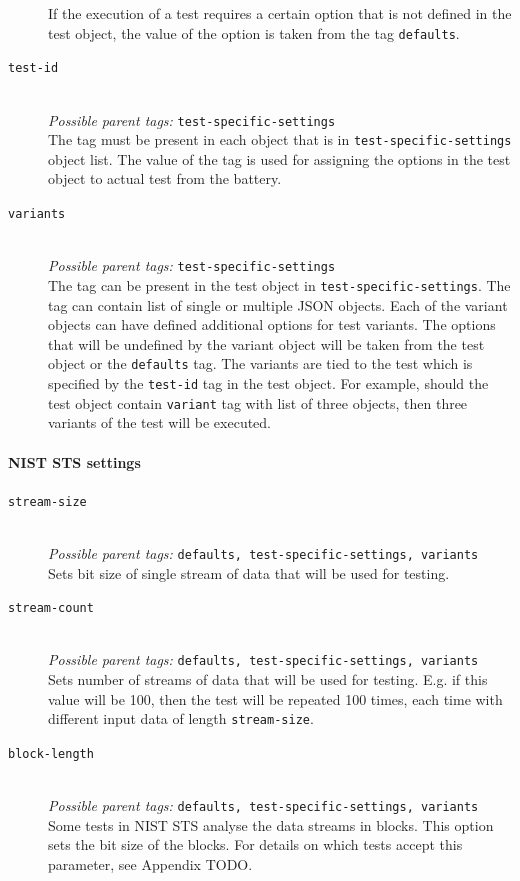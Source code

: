 \documentclass[
  digital,  	%
  color,		%
  oneside,   	%
  12pt,
  nocover,
  notable,
  nolof,
  nolot,
]{fithesis3}
\begin{document}
\begin{description}
If the execution of a test requires a certain option that is not defined in the test object, the value of the option is taken from the tag \texttt{defaults}.

\item[\texttt{test-id}] \hfill \\
\textit{Possible parent tags: } \texttt{test-specific-settings} \\
The tag must be present in each object that is in \texttt{test-specific-settings} object list. The value of the tag is used for assigning the options in the test object to actual test from the battery.

\item[\texttt{variants}] \hfill \\
\textit{Possible parent tags: } \texttt{test-specific-settings} \\
The tag can be present in the test object in \texttt{test-specific-settings}. The tag can contain list of single or multiple JSON objects. Each of the variant objects can have defined additional options for test variants. The options that will be undefined by the variant object will be taken from the test object or the \texttt{defaults} tag. The variants are tied to the test which is specified by the \texttt{test-id} tag in the test object. For example, should the test object contain \texttt{variant} tag with list of three objects, then three variants of the test will be executed.
\end{description}

\paragraph{NIST STS settings}

\begin{description}
\item[\texttt{stream-size}] \hfill \\
\textit{Possible parent tags: } \texttt{defaults, test-specific-settings, variants} \\
Sets bit size of single stream of data that will be used for testing.

\item[\texttt{stream-count}] \hfill \\
\textit{Possible parent tags: } \texttt{defaults, test-specific-settings, variants} \\
Sets number of streams of data that will be used for testing. E.g. if this value will be 100, then the test will be repeated 100 times, each time with different input data of length \texttt{stream-size}.

\item[\texttt{block-length}] \hfill \\
\textit{Possible parent tags: } \texttt{defaults, test-specific-settings, variants} \\
Some tests in NIST STS analyse the data streams in blocks. This option sets the bit size of the blocks. For details on which tests accept this parameter, see Appendix TODO.

\end{description}
\end{document}
